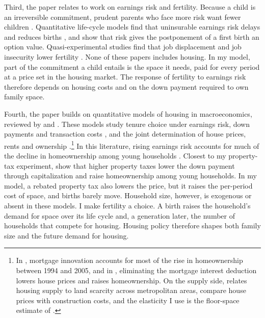 Third, the paper relates to work on earnings risk and fertility. Because a
child is an irreversible commitment, prudent parents who face more risk want
fewer children \citep{fraserIncomeRisk2001}. Quantitative life-cycle models
find that uninsurable earnings risk delays and reduces births
\citep{sommerFertilityChoiceLife2016,ejrnaesJorgensenFamilyPlanning2020,nakakuniFertilityIncomeUncertainty2026},
and \citet{deLaCroixPommeretChildbearing2021} show that risk gives the
postponement of a first birth an option value. Quasi-experimental studies
find that job displacement and job insecurity lower fertility
\citep{delBonoWeberWinterEbmer2012,clarkLepinteurJobInsecurity2022}. None of
these papers includes housing. In my model, part of the commitment a child
entails is the space it needs, paid for every period at a price set in the
housing market. The response of fertility to earnings risk therefore depends
on housing costs and on the down payment required to own family space.

Fourth, the paper builds on quantitative models of housing in macroeconomics,
reviewed by \citet{davisHousingFinanceMacroeconomy2015} and
\citet{piazzesiSchneiderHousing2016}. These models study tenure choice under
earnings risk, down payments and transaction costs
\citep{fisherGervaisHomeOwnership2011,halketVasudevSaving2014,boarGoreaMidriganLiquidity2022},
and the joint determination of house prices, rents and ownership
\citep{kaplanMitmanViolanteHousing2020,greenwaldGurenCredit2025,greaneyDynamicUrbanEconomics2025}.\footnote{In
\citet{chambersAccountingChangesHomeownership2009}, mortgage innovation
accounts for most of the rise in homeownership between 1994 and 2005, and in
\citet{sommerImplicationsUSTax2018}, eliminating the mortgage interest
deduction lowers house prices and raises homeownership. On the supply side,
\citet{saizGeographicDeterminantsHousing2010} relates housing supply to land
scarcity across metropolitan areas, \citet{glaeserEconomicImplicationsHousing2018}
compare house prices with construction costs, and the elasticity I use is the
floor-space estimate of \citet{baum-snowMicrogeographyHousingSupply2024}.} In
this literature, rising earnings risk accounts for much of the decline in
homeownership among young households
\citep{fisherGervaisHomeOwnership2011,pazPardoHomeownership2024}. Closest to my
property-tax experiment, \citet{coven2024} show that higher property taxes
lower the down payment through capitalization and raise homeownership among
young households. In my model, a rebated property tax also lowers the price,
but it raises the per-period cost of space, and births barely move. Household
size, however, is exogenous or absent in these models. I make fertility a
choice. A birth raises the household's demand for space over its life cycle
and, a generation later, the number of households that compete for housing.
Housing policy therefore shapes both family size and the future demand for
housing.
